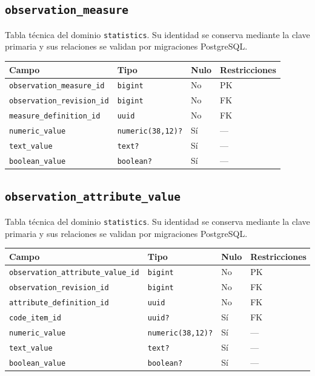 \documentclass[11pt]{article}
\begin{document}
\subsection{\texttt{observation\_measure}}
Tabla técnica del dominio \texttt{statistics}. Su identidad se conserva mediante la clave primaria y sus relaciones se validan por migraciones PostgreSQL.
\begin{longtable}{>{\raggedright\arraybackslash}p{} p{} p{} p{}}
\toprule Campo & Tipo & Nulo & Restricciones \\ \midrule\endhead
\texttt{observation\_measure\_id} & \texttt{bigint} & No & PK \\
\texttt{observation\_revision\_id} & \texttt{bigint} & No & FK \\
\texttt{measure\_definition\_id} & \texttt{uuid} & No & FK \\
\texttt{numeric\_value} & \texttt{numeric(38,12)?} & Sí & --- \\
\texttt{text\_value} & \texttt{text?} & Sí & --- \\
\texttt{boolean\_value} & \texttt{boolean?} & Sí & --- \\
\bottomrule\end{longtable}
\subsection{\texttt{observation\_attribute\_value}}
Tabla técnica del dominio \texttt{statistics}. Su identidad se conserva mediante la clave primaria y sus relaciones se validan por migraciones PostgreSQL.
\begin{longtable}{>{\raggedright\arraybackslash}p{} p{} p{} p{}}
\toprule Campo & Tipo & Nulo & Restricciones \\ \midrule\endhead
\texttt{observation\_attribute\_value\_id} & \texttt{bigint} & No & PK \\
\texttt{observation\_revision\_id} & \texttt{bigint} & No & FK \\
\texttt{attribute\_definition\_id} & \texttt{uuid} & No & FK \\
\texttt{code\_item\_id} & \texttt{uuid?} & Sí & FK \\
\texttt{numeric\_value} & \texttt{numeric(38,12)?} & Sí & --- \\
\texttt{text\_value} & \texttt{text?} & Sí & --- \\
\texttt{boolean\_value} & \texttt{boolean?} & Sí & --- \\
\bottomrule\end{longtable}
\end{document}
